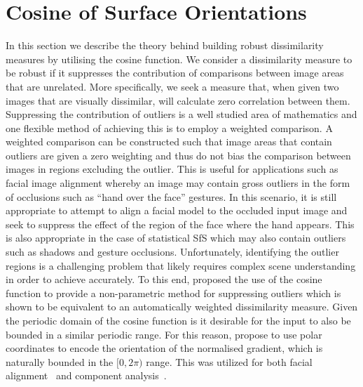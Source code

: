 \section{Cosine of Surface Orientations}\label{sec:singl_img_cosine_orientations}
In this section we describe the theory behind building robust dissimilarity
measures by utilising the cosine function. We consider a
dissimilarity measure to be robust if it suppresses the contribution of
comparisons between image areas that are unrelated. More specifically, we seek a
measure that, when given two images that are visually dissimilar, will calculate
zero correlation between them. Suppressing the contribution of outliers is
a well studied area of mathematics and one flexible method of achieving this
is to employ a weighted comparison. A weighted comparison can be constructed
such that image areas that contain outliers are given a zero weighting and thus
do not bias the comparison between images in regions excluding the outlier.
This is useful for applications such as facial image alignment whereby an image
may contain gross outliers in the form of occlusions such as ``hand over the
face'' gestures. In this scenario, it is still appropriate to attempt to
align a facial model to the occluded input image and seek to suppress
the effect of the region of the face where the hand appears. This is also
appropriate in the case of statistical SfS which may also contain outliers
such as shadows and gesture occlusions. Unfortunately, identifying the outlier
regions is a challenging problem that likely requires complex scene
understanding in order to achieve accurately.
To this end, \citet{tzimiropoulos2012subspace} proposed the use of the cosine
function to provide a non-parametric method for suppressing outliers which
is shown to be equivalent to an automatically weighted dissimilarity measure.
Given the periodic domain of the cosine function is it desirable for the
input to also be bounded in a similar periodic range. For this reason,
\citet{tzimiropoulos2012subspace} propose to use polar coordinates to encode
the orientation of the normalised gradient, which is naturally bounded in the
$[0, 2\pi)$ range. This was utilized for both facial
alignment~\cite{tzimiropoulos2011robust,tzimiropoulos2014active,%
antonakos2015feature} and component
analysis~\cite{tzimiropoulos2012subspace,tzimiropoulos2014active}.

